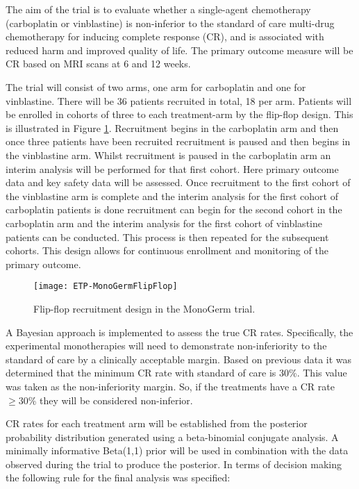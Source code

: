 The aim of the trial is to evaluate whether a single-agent chemotherapy (carboplatin or vinblastine) is non-inferior to	the standard of care multi-drug chemotherapy for inducing complete response (CR), and is associated with reduced harm and improved quality of life. The primary outcome measure will be CR based on MRI scans at 6 and 12 weeks. 

The trial will consist of two arms, one arm for carboplatin and one for vinblastine. There will be 36 patients recruited in total, 18 per arm. Patients will be enrolled in cohorts of three to each treatment-arm by the flip-flop design. This is illustrated in Figure \ref{fig_etp:MonoGermFlipFlop}. Recruitment begins in the carboplatin arm and then once three patients have been recruited recruitment is paused and then begins in the vinblastine arm. Whilst recruitment is paused in the carboplatin arm an interim analysis will be performed for that first cohort. Here primary outcome data and key safety data will be assessed. Once recruitment to the first cohort of the vinblastine arm is complete and the interim analysis for the first cohort of carboplatin patients is done recruitment can begin for the second cohort in the carboplatin arm and the interim analysis for the first cohort of vinblastine patients can be conducted. This process is then repeated for the subsequent cohorts. This design allows for continuous enrollment and monitoring of the primary outcome. 

\begin{figure}[h!]
	\centering
	\caption{Flip-flop recruitment design in the MonoGerm trial.}
	\label{fig_etp:MonoGermFlipFlop}
	\texttt{[image: ETP-MonoGermFlipFlop]}
\end{figure}

A Bayesian approach is implemented to assess the true CR rates. Specifically, the experimental monotherapies will need to demonstrate non-inferiority to the standard of care by a clinically acceptable margin. Based on previous data it was determined that the minimum CR rate with standard of care is 30\%. This value was taken as the non-inferiority margin. So, if the treatments have a CR rate $\geq30$\% they will be considered non-inferior. 

CR rates for each treatment arm will be established from the posterior probability distribution generated using a beta-binomial conjugate analysis. A minimally informative Beta(1,1) prior will be used in combination with the data observed during the trial to produce the posterior. In terms of decision making the following rule for the final analysis was specified: 

